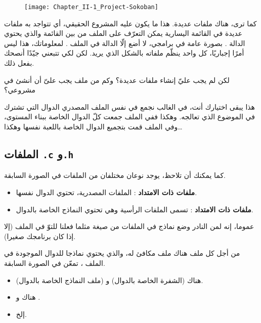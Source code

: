 \begin{figure}[H]
	\centering
	\texttt{[image: Chapter\_II-1\_Project-Sokoban]}
\end{figure}

كما ترى، هناك ملفات عديدة. هذا ما يكون عليه المشروع الحقيقي، أي تتواجد به ملفات عديدة في القائمة اليسارية  يمكن التعرّف على الملف
من بين القائمة والذي يحتوي الدالة
.
بصورة عامة في برامجي، لا أضع إلّا الدالة
في الملف
.
لمعلوماتك، هذا ليس أمرًا إجباريًا، كل واحد ينظّم ملفاته بالشكل الذي يريد. لكن لكي تتبعني جيّدًا أنصحك بفعل ذلك.

\begin{question}
  لكن لم يجب عليّ إنشاء ملفات عديدة؟ وكم من ملف يجب علىّ أن أنشئ في مشروعي؟
\end{question}

هذا يبقى اختيارك أنت، في الغالب نجمع في نفس الملف المصدري الدوال التي تشترك في الموضوع الذي تعالجه. وهكذا ففي الملف
جمعت كلّ الدوال الخاصة ببناء المستوى، وفي الملف
قمت بتجميع الدوال الخاصة باللعبة نفسها وهكذا\dots

\subsection{الملفات \texttt{.c} و\texttt{.h}}

كما يمكنك أن تلاحظ، يوجد نوعان مختلفان من الملفات في الصورة السابقة.

\begin{itemize}
  \item \textbf{ملفات ذات الامتداد
}:
 الملفات المصدرية، تحتوي الدوال نفسها.
  \item \textbf{ملفات ذات الامتداد
}:
 تسمى الملفات الرأسية وهي تحتوي النماذج الخاصة بالدوال.
\end{itemize}

عموما، إنه لمن النادر وضع نماذج في الملفات من صيغة
مثلما فعلنا للتوّ في الملف
(إلا إذا كان برنامجك صغيرا).

من أجل كل ملف
هناك ملف مكافئ له، والذي يحتوي نماذجا للدوال الموجودة في الملف
،
تمعّن في الصورة السابقة.

\begin{itemize}
  \item هناك
(الشفرة الخاصة بالدوال) و
(ملف النماذج الخاصة بالدوال).
  \item هناك
و
.
  \item إلخ.
\end{itemize}

